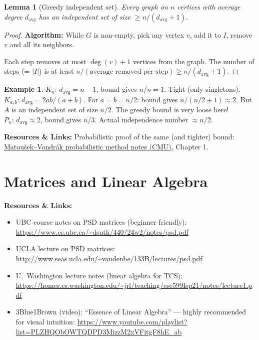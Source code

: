 \documentclass[12pt]{article}
\newtheorem{lemma}[theorem]{Lemma}
\theoremstyle{definition}
\newtheorem{example}[theorem]{Example}
\theoremstyle{remark}
\newcommand{\resources}[1]{%
  \vspace{4pt}
  \noindent\colorbox{blue!8}{\parbox{\dimexpr\linewidth-2\fboxsep}{%
    \small\textbf{Resources \& Links:} #1}}
  \vspace{4pt}
}
\begin{document}
\begin{lemma}[Greedy independent set]\label{lem:greedy-indep}
Every graph on $n$ vertices with average degree $d_{\mathrm{avg}}$ has an independent set of size
$\ge n / (d_{\mathrm{avg}} + 1)$.
\end{lemma}

\begin{proof}
\textbf{Algorithm:} While $G$ is non-empty, pick any vertex $v$, add it to $I$,
remove $v$ and all its neighbors.

Each step removes at most $\deg(v)+1$ vertices from the graph.
The number of steps (= $|I|$) is at least $n / (\text{average removed per step})
\ge n / (d_{\mathrm{avg}}+1)$.
\end{proof}

\begin{example}
$K_n$: $d_{\mathrm{avg}} = n-1$, bound gives $n/n = 1$.  Tight (only singletons).\\
$K_{a,b}$: $d_{\mathrm{avg}} = 2ab/(a+b)$.  For $a=b=n/2$: bound gives $n/(n/2+1) \approx 2$.
But $A$ is an independent set of size $n/2$.  The greedy bound is very loose here!\\
$P_n$: $d_{\mathrm{avg}} \approx 2$, bound gives $n/3$.  Actual independence number $\approx n/2$.
\end{example}

\resources{
Probabilistic proof of the same (and tighter) bound:
\href{https://www.cs.cmu.edu/~15850/handouts/matousek-vondrak-prob-ln.pdf}%
{Matou\v{s}ek--Vondr\'ak probabilistic method notes (CMU)}, Chapter 1.
}

\section{Matrices and Linear Algebra}

\resources{
\begin{itemize}\setlength\itemsep{0pt}
  \item UBC course notes on PSD matrices (beginner-friendly):
        \url{https://www.cs.ubc.ca/~dsuth/440/24w2/notes/psd.pdf}
  \item UCLA lecture on PSD matrices:
        \url{http://www.seas.ucla.edu/~vandenbe/133B/lectures/psd.pdf}
  \item U.\ Washington lecture notes (linear algebra for TCS):
        \url{https://homes.cs.washington.edu/~jrl/teaching/cse599Isp21/notes/lecture1.pdf}
  \item 3Blue1Brown (video): ``Essence of Linear Algebra'' --- highly recommended for visual intuition:
        \url{https://www.youtube.com/playlist?list=PLZHQObOWTQDPD3MizzM2xVFitgF8hE_ab}
\end{itemize}
}
\end{document}
